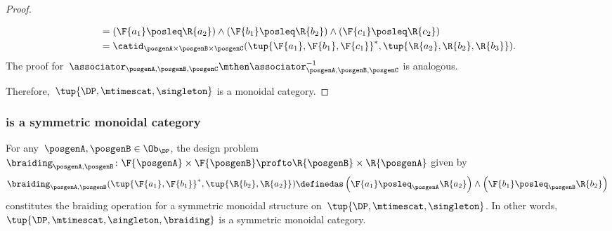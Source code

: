 \begin{proof}
\begin{compactitem}
\begin{equation}
\begin{aligned}
                &=(\F{a_1}\posleq \R{a_2}) \wedge (\F{b_1}\posleq \R{b_2}) \wedge (\F{c_1}\posleq \R{c_2})\\
                &=\catid_{\posgenA\times \posgenB\times \posgenC}(\tup{\F{a_1},\F{b_1},\F{c_1}}^*,\tup{\R{a_2},\R{b_2},\R{b_3}}).
            \end{aligned}
        \end{equation}
        The proof for~$\associator_{\posgenA,\posgenB,\posgenC}\mthen \associator_{\posgenA,\posgenB,\posgenC}^{-1}$ is analogous.
    \end{compactitem}
    Therefore,~$\tup{\DP,\mtimescat, \singleton}$ is a monoidal category.
\end{proof}

\subsubsection*{\DP is a symmetric monoidal category}
\begin{lemma}
    \label{lem:symmetricmonoidaldp}
    For any~$\posgenA,\posgenB \in\Ob_\DP$, the design problem~$\braiding_{\posgenA,\posgenB}\colon \F{\posgenA} \times \F{\posgenB} \profto \R{\posgenB} \times \R{\posgenA}$ given by
    \begin{equation}
        \braiding_{\posgenA,\posgenB}(\tup{\F{a_1},\F{b_1}}^*,\tup{\R{b_2},\R{a_2}})\definedas \left(\F{a_1}\posleq_\posgenA \R{a_2}\right)\wedge \left(\F{b_1}\posleq_\posgenB \R{b_2}\right)
    \end{equation}
    constitutes the braiding operation for a symmetric monoidal structure on~$\tup{\DP,\mtimescat,\singleton}$.
    In other words,~$\tup{\DP, \mtimescat, \singleton, \braiding}$ is a symmetric monoidal category.
\end{lemma}

